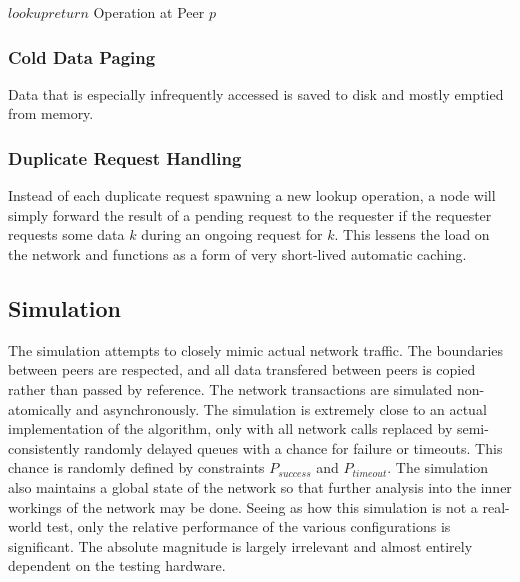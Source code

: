 \documentclass[apa6]{IEEEtran}
\theoremstyle{plain}
\begin{document}
		\begin{algorithm}
			\scriptsize
			\LinesNumbered
			\DontPrintSemicolon
			\begin{lrbox}{\mybox}
				\begin{minipage}{\hsize}
					\Indentp{-1em}
					\Indentp{1.2em}
				\end{minipage}%
			\end{lrbox}
			\hspace*{-10pt}\framebox[\columnwidth]{\hspace*{15pt}\usebox\mybox\par}
			\caption{$lookupreturn$ Operation at Peer $p$}
			\label{alg:lookupreturn}
		\end{algorithm}

\subsubsection{Cold Data Paging}
Data that is especially infrequently accessed is saved to disk and mostly emptied from memory.

\subsubsection{Duplicate Request Handling}
Instead of each duplicate request spawning a new lookup operation, a node will simply forward the result of a pending request to the requester if the requester requests some data $k$ during an ongoing request for $k$. This lessens the load on the network and functions as a form of very short-lived automatic caching.

\subsection{Simulation}
	The simulation attempts to closely mimic actual network traffic. The boundaries between peers are respected, and all data transfered between peers is copied rather than passed by reference. The network transactions are simulated non-atomically and asynchronously. The simulation is extremely close to an actual implementation of the algorithm, only with all network calls replaced by semi-consistently randomly delayed queues with a chance for failure or timeouts. This chance is randomly defined by constraints $P_{success}$ and $P_{timeout}$. The simulation also maintains a global state of the network so that further analysis into the inner workings of the network may be done. Seeing as how this simulation is not a real-world test, only the relative performance of the various configurations is significant. The absolute magnitude is largely irrelevant and almost entirely dependent on the testing hardware.
\end{document}
